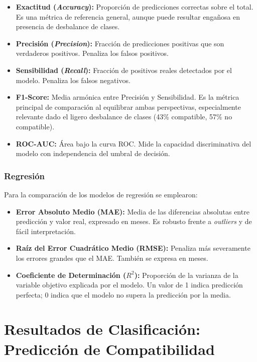 \begin{itemize}
    \item \textbf{Exactitud (\textit{Accuracy}):} Proporción de predicciones correctas sobre el total. Es una métrica de referencia general, aunque puede resultar engañosa en presencia de desbalance de clases.
    \item \textbf{Precisión (\textit{Precision}):} Fracción de predicciones positivas que son verdaderos positivos. Penaliza los falsos positivos.
    \item \textbf{Sensibilidad (\textit{Recall}):} Fracción de positivos reales detectados por el modelo. Penaliza los falsos negativos.
    \item \textbf{F1-Score:} Media armónica entre Precisión y Sensibilidad. Es la métrica principal de comparación al equilibrar ambas perspectivas, especialmente relevante dado el ligero desbalance de clases (43\% compatible, 57\% no compatible).
    \item \textbf{ROC-AUC:} Área bajo la curva ROC. Mide la capacidad discriminativa del modelo con independencia del umbral de decisión.
\end{itemize}

\subsubsection{Regresión}
Para la comparación de los modelos de regresión se emplearon:

\begin{itemize}
    \item \textbf{Error Absoluto Medio (MAE):} Media de las diferencias absolutas entre predicción y valor real, expresado en meses. Es robusto frente a \textit{outliers} y de fácil interpretación.
    \item \textbf{Raíz del Error Cuadrático Medio (RMSE):} Penaliza más severamente los errores grandes que el MAE. También se expresa en meses.
    \item \textbf{Coeficiente de Determinación ($R^2$):} Proporción de la varianza de la variable objetivo explicada por el modelo. Un valor de 1 indica predicción perfecta; 0 indica que el modelo no supera la predicción por la media.
\end{itemize}

\section{Resultados de Clasificación: Predicción de Compatibilidad}
\label{sec:resultados_clasificacion}

